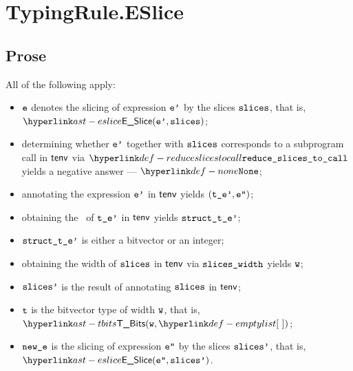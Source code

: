 
\section{TypingRule.ESlice \label{sec:TypingRule.ESlice}}

\subsection{Prose}
All of the following apply:
\begin{itemize}
  \item $\texttt{e}$ denotes the slicing of expression $\texttt{e'}$ by the slices $\texttt{slices}$, that is, \\
  $\ESlice(\vep, \slices)$;
  \item determining whether $\texttt{e'}$ together with $\texttt{slices}$ corresponds to a subprogram call
  in $\textsf{tenv}$ via $\reduceslicestocall$ yields a negative answer --- $\None$\ProseOrTypeError;
  \item annotating the expression $\texttt{e'}$ in $\textsf{tenv}$ yields $(\texttt{t\_e'},\texttt{e''})$\ProseOrTypeError;
  \item obtaining the \structure\ of $\texttt{t\_e'}$ in $\textsf{tenv}$ yields $\texttt{struct\_t\_e'}$\ProseOrTypeError;
  \item $\texttt{struct\_t\_e'}$ is either a bitvector or an integer;
  \item obtaining the width of $\texttt{slices}$ in $\textsf{tenv}$ via $\texttt{slices\_width}$ yields $\texttt{w}$\ProseOrTypeError;
  \item $\texttt{slices'}$ is the result of annotating $\texttt{slices}$ in $\textsf{tenv}$;
  \item $\texttt{t}$ is the bitvector type of width $\texttt{w}$, that is, $\TBits(\vw, \emptylist)$;
  \item $\texttt{new\_e}$ is the slicing of expression $\texttt{e''}$ by the slices $\texttt{slices'}$, that is, \\
  $\ESlice(\vepp, \slicesp)$.
\end{itemize}



